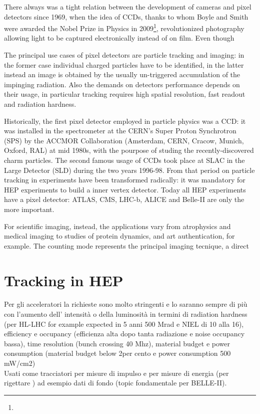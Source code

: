 There always was a tight relation between the development of cameras and pixel detectors since 1969, when the idea of CCDs, thanks to whom Boyle and Smith were awarded the Nobel Prize in Physics in 2009\footnote{}, revolutionized photography allowing light to be captured electronically instead of on film. 
Even though



The principal use cases of pixel detectors are particle tracking and imaging: in the former case individual charged particles have to be identified, in the latter instead an image is obtained by the usually un-triggered accumulation of the impinging radiation. 
Also the demands on detectors performance depends on their usage, in particular tracking requires high spatial resolution, fast readout and radiation hardness. 

Historically, the first pixel detector employed in particle physics was a CCD: it was installed in the spectrometer at the CERN’s Super Proton Synchrotron (SPS) by the ACCMOR Collaboration (Amsterdam, CERN, Cracow, Munich, Oxford, RAL) at mid 1980s, with the pourpose of studing the recently-discovered charm particles.
The second famous usage of CCDs took place at SLAC in the Large Detector (SLD) during the two years 1996-98. From that period on particle tracking in experiments have been transformed radically: it was mandatory for HEP experiments to build a inner vertex detector. Today all HEP experiments have a pixel detector: ATLAS, CMS, LHC-b, ALICE and Belle-II are only the more important. 

For scientific imaging, instead, the applications vary from atrophysics and medical imaging to studies of protein dynamics,  and art authentication, for example. 
The counting mode represents the principal imaging tecnique, a direct 

\section{Tracking in HEP}
    Per gli acceleratori la richieste sono molto stringenti e lo saranno sempre di più con l'aumento dell' intensità o della luminosità in termini di radiation hardness (per HL-LHC for example expected in 5 anni 500 Mrad e NIEL di 10 alla 16), efficiency e occupancy (efficienza alta dopo tanta radiazione e noise occupancy bassa), time resolution (bunch crossing 40 Mhz), material budget e power consumption (material budget below 2per cento e power consumption 500 mW/cm2)\\
    Usati come tracciatori per misure di impulso e per misure di energia (per rigettare ) ad esempio dati di fondo (topic fondamentale per BELLE-II).

